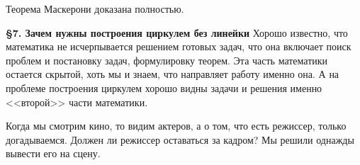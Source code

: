 \begin{multicols}{2}
Теорема Маскерони доказана полностью.\par
\par
\textbf{\S7. Зачем нужны построения циркулем без линейки}\newline
Хорошо известно, что математика не исчерпывается решением готовых задач, что она включает поиск проблем и постановку задач, формулировку теорем. Эта часть математики остается скрытой, хоть мы и знаем, что направляет работу именно она. А на проблеме построения циркулем хорошо видны задачи и решения именно <<второй>> части математики.\par
Когда мы смотрим кино, то видим актеров, а о том, что есть режиссер, только догадываемся. Должен ли режиссер оставаться за кадром? Мы решили однажды вывести его на сцену.

\end{multicols}


